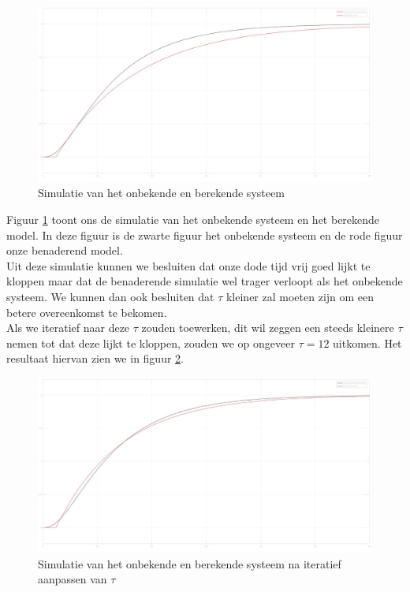 \documentclass[a4paper, 12pt]{article}
\begin{document}
\begin{figure}[!h]
	\includegraphics[width=1\linewidth]{Labo1_3_scoop.jpg}
	\caption{Simulatie van het onbekende en berekende systeem}
	\label{fig:scoop3.1}
\end{figure}

\newpage

Figuur \ref{fig:scoop3.1} toont ons de simulatie van het onbekende systeem en het berekende model. In deze figuur is de zwarte figuur het onbekende systeem en de rode figuur onze benaderend model. \\
Uit deze simulatie kunnen we besluiten dat onze dode tijd vrij goed lijkt te kloppen maar dat de benaderende simulatie wel trager verloopt als het onbekende systeem. We kunnen dan ook besluiten dat $\tau$ kleiner zal moeten zijn om een betere overeenkomst te bekomen. \\
Als we iteratief naar deze $\tau$ zouden toewerken, dit wil zeggen een steeds kleinere $\tau$ nemen tot dat deze lijkt te kloppen, zouden we op ongeveer $\tau = 12$ uitkomen. Het resultaat hiervan zien we in figuur \ref{fig:scoop3.2}.

\begin{figure}[!h]
	\includegraphics[width=0.9\linewidth]{Labo1_3_scoop2.jpg}
	\caption{Simulatie van het onbekende en berekende systeem na iteratief aanpassen van $\tau$}
	\label{fig:scoop3.2}
\end{figure}
\end{document}
